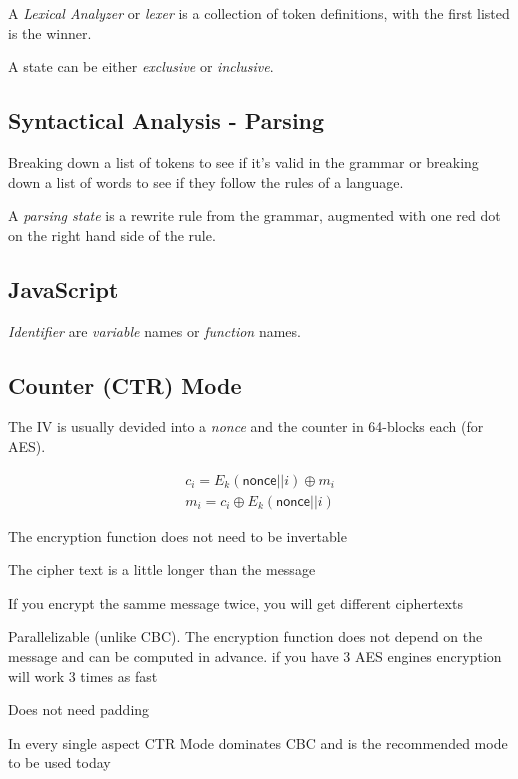 \documentclass[12pt]{article}
\begin{document}
A \emph{Lexical Analyzer} or \emph{lexer} is a collection of token definitions, with the first listed is the winner.



A state can be either \emph{exclusive} or \emph{inclusive}.



\subsection{Syntactical Analysis - Parsing}

Breaking down a list of tokens to see if it's valid in the grammar or breaking down a list of words to see if they follow the rules of a language.

A \emph{parsing state} is a rewrite rule from the grammar, augmented with one red dot on the right hand side of the rule.



\subsection{JavaScript}

\emph{Identifier} are \emph{variable} names or \emph{function} names.





\subsection*{Counter (CTR) Mode}

The IV is usually devided into a \emph{nonce} and the counter in 64-blocks each (for AES).

\begin{equation}
\begin{split}
c_i = E_k(\textsf{nonce}||i) \oplus m_i \\
m_i = c_i \oplus E_k(\textsf{nonce}||i)
\end{split}
\end{equation}

\begin{list}{*}{
\setlength{\itemsep}{0pt}
\setlength{\parsep}{0pt}
\setlength{\topsep}{0pt}
\setlength{\partopsep}{0pt}
\setlength{\leftmargin}{2em}
\setlength{\labelwidth}{1.5em}
\setlength{\labelsep}{0.5em}
}
\item The encryption function does not need to be invertable
\item The cipher text is a little longer than the message
\item If you encrypt the samme message twice, you will get different ciphertexts
\item Parallelizable (unlike CBC). The encryption function does not depend on the message and can be computed in advance. if you have 3 AES engines encryption will work 3 times as fast
\item Does not need padding
\item In every single aspect CTR Mode dominates CBC and is the recommended mode to be used today
\end{list}
\end{document}
